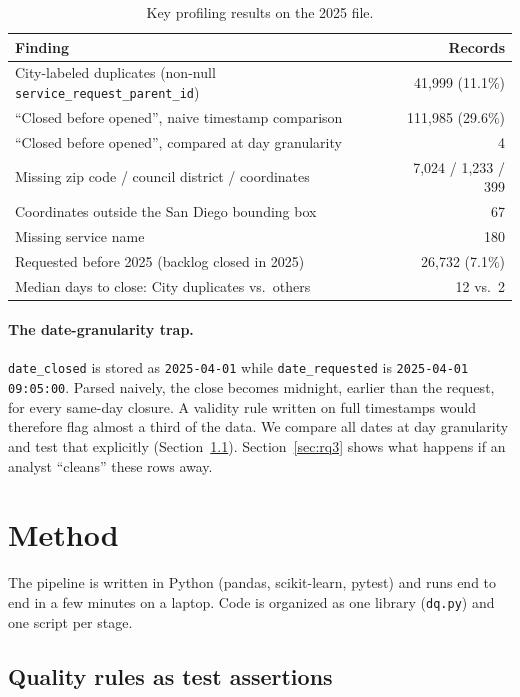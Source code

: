 \documentclass[11pt]{article}
\begin{document}
\begin{table}[tbp]
\centering\small
\caption{Key profiling results on the 2025 file.}
\label{tab:profile}
\begin{tabularx}{\linewidth}{@{}Xr@{}}
\toprule
Finding & Records \\
\midrule
City-labeled duplicates (non-null \texttt{service\_request\_parent\_id}) & 41,999 (11.1\%) \\
``Closed before opened'', naive timestamp comparison & 111,985 (29.6\%) \\
``Closed before opened'', compared at day granularity & 4 \\
Missing zip code / council district / coordinates & 7,024 / 1,233 / 399 \\
Coordinates outside the San Diego bounding box & 67 \\
Missing service name & 180 \\
Requested before 2025 (backlog closed in 2025) & 26,732 (7.1\%) \\
Median days to close: City duplicates vs.\ others & 12 vs.\ 2 \\
\bottomrule
\end{tabularx}
\end{table}

\paragraph{The date-granularity trap.} \texttt{date\_closed} is stored as \texttt{2025-04-01} while \texttt{date\_requested} is \texttt{2025-04-01 09:05:00}. Parsed naively, the close becomes midnight, earlier than the request, for every same-day closure. A validity rule written on full timestamps would therefore flag almost a third of the data. We compare all dates at day granularity and test that explicitly (Section~\ref{sec:rules}). Section~\ref{sec:rq3} shows what happens if an analyst ``cleans'' these rows away.

\section{Method}

The pipeline is written in Python (pandas, scikit-learn, pytest) and runs end to end in a few minutes on a laptop. Code is organized as one library (\texttt{dq.py}) and one script per stage.

\subsection{Quality rules as test assertions}
\label{sec:rules}
\end{document}
